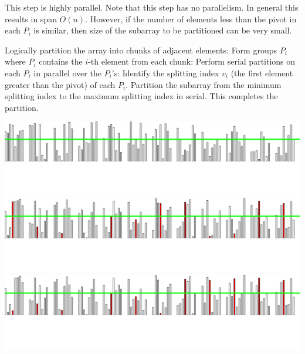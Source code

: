 \documentclass[xcolor=x11names, svgnames, rgb]{beamer}
\begin{document}
\begin{frame}[t]{}
\begin{overprint}
	\end{overprint}
	\vspace{0.25cm}
	\begin{overprint}
	This step is highly parallel.
	\onslide<5> Note that this step has no parallelism. In general this results in span $O(n)$. However, if the number of elements less than the pivot in each $P_i$ is similar, then size of the subarray to be partitioned can be very small.
	\end{overprint}
\end{frame}

\begin{frame}[t]{}%
	\vspace{0.25cm}
	\begin{overprint}
	Logically partition the array into chunks of adjacent elements:
	\onslide<2>Form groups $P_i$ where $P_i$ contains the $i$-th element from each chunk:
	\onslide<3>Perform serial partitions on each $P_i$ in parallel over the $P_i$'s:
	\onslide<5>Identify the splitting index $v_i$ (the first element greater than the pivot) of each $P_i$. 
	\onslide<7>Partition the subarray from the minimum splitting index to the maximum splitting index in serial. This completes the partition. 
	\end{overprint}
	\vspace{0.25cm}
	\begin{overprint}
	\includegraphics[width=\linewidth]{imgs/stridedAlgSim/stridedAlgSim_1.png}
	\onslide<2>\includegraphics[width=\linewidth]{imgs/stridedAlgSim/stridedAlgSim_2.png}
	\onslide<3>\includegraphics[width=\linewidth]{imgs/stridedAlgSim/stridedAlgSim_3.png}

\end{overprint}
\end{frame}
\end{document}
